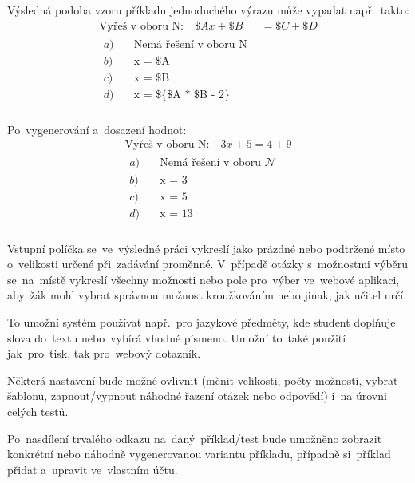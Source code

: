 \documentclass[11pt,a4paper]{report}
\begin{document}
            Výsledná podoba vzoru příkladu jednoduchého výrazu může vypadat např.~takto:
            \begin{align*}
                \text{Vyřeš v oboru N:} \quad \$Ax + \$B &= \$C + \$D \\
                \begin{aligned}
                    a) \quad &\text{Nemá řešení v oboru N} \\
                    b) \quad &\text{x = \$A} \\
                    c) \quad &\text{x = \$B} \\
                    d) \quad &\text{x = \$\{\$A * \$B - 2\}} \\
                \end{aligned}
            \end{align*}

            Po~vygenerování a~dosazení hodnot:
            \begin{align*}
                \text{Vyřeš v oboru N:} \quad 3x + 5 = 4 + 9 \\
                \begin{aligned}
                    a) \quad &\text{Nemá řešení v oboru }\mathcal{N} \\
                    b) \quad &\text{x = 3} \\
                    c) \quad &\text{x = 5} \\
                    d) \quad &\text{x = 13} \\
                \end{aligned}
            \end{align*}

            Vstupní políčka se~ve~výsledné práci vykreslí jako prázdné nebo podtržené místo o~velikosti určené při~zadávání proměnné. V~případě otázky s~možnostmi výběru se~na~místě vykreslí všechny možnosti nebo pole pro~výber ve~webové aplikaci, aby~žák mohl vybrat správnou možnost kroužkováním nebo jinak, jak učitel určí.
            
            To umožní systém používat např.~pro jazykové předměty, kde student doplňuje slova do~textu nebo~vybírá vhodné písmeno. Umožní to~také použití jak~pro~tisk, tak pro~webový dotazník.

            Některá nastavení bude možné ovlivnit (měnit velikosti, počty možností, vybrat šablonu, zapnout/vypnout náhodné řazení otázek nebo odpovědí) i~na úrovni celých testů.

            Po~nasdílení trvalého odkazu na~daný~příklad/test bude umožněno zobrazit konkrétní nebo náhodně vygenerovanou variantu příkladu, případně si~příklad přidat a~upravit ve~vlastním účtu.
\end{document}
